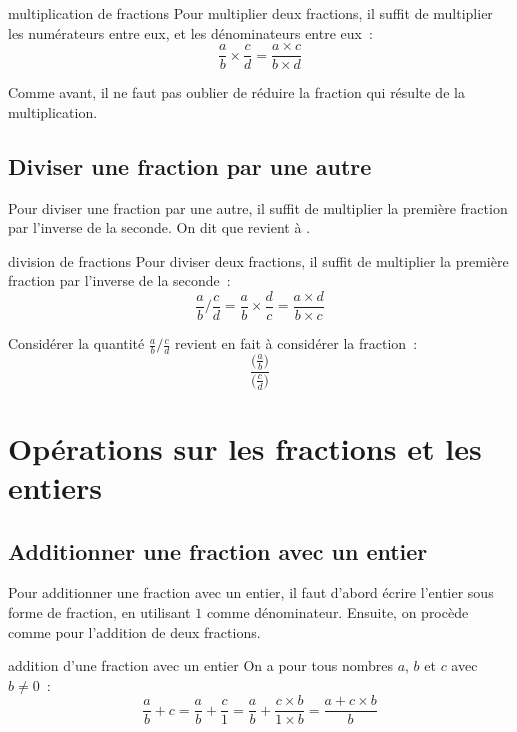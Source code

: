 \documentclass[12pt]{article}
\begin{document}
\begin{proposition}{}{multiplication de fractions}
    Pour multiplier deux fractions, il suffit de multiplier les numérateurs entre eux, et les dénominateurs entre eux~:
    $$\frac{a}{b} \times \frac{c}{d} = \frac{a \times c}{b \times d}$$
\end{proposition}

\begin{remarque}{}{}
    Comme avant, il ne faut pas oublier de réduire la fraction qui résulte de la multiplication.
\end{remarque}

\subsection{Diviser une fraction par une autre}

Pour diviser une fraction par une autre, il suffit de multiplier la première fraction par l'inverse de la seconde. On dit que  revient à .

\begin{proposition}{}{division de fractions}
    Pour diviser deux fractions, il suffit de multiplier la première fraction par l'inverse de la seconde~:
    $$\frac{a}{b} / \frac{c}{d} = \frac{a}{b} \times \frac{d}{c} = \frac{a \times d}{b \times c}$$
\end{proposition}

\begin{remarque}{}{}
    Considérer la quantité $\frac{a}{b} / \frac{c}{d}$ revient en fait à considérer la fraction~:
    $$\frac{\Big(\frac{a}{b}\Big)}{\Big(\frac{c}{d}\Big)}$$
\end{remarque}

\section{Opérations sur les fractions et les entiers}

\subsection{Additionner une fraction avec un entier}

Pour additionner une fraction avec un entier, il faut d'abord écrire l'entier sous forme de fraction, en utilisant $1$ comme dénominateur. Ensuite, on procède comme pour l'addition de deux fractions.

\begin{proposition}{}{addition d'une fraction avec un entier}
    On a pour tous nombres $a$, $b$ et $c$ avec $b \neq 0$~:
    $$\frac{a}{b} + c = \frac{a}{b} + \frac{c}{1} = \frac{a}{b} + \frac{c \times b}{1 \times b} = \frac{a + c \times b}{b}$$
\end{proposition}
\end{document}
